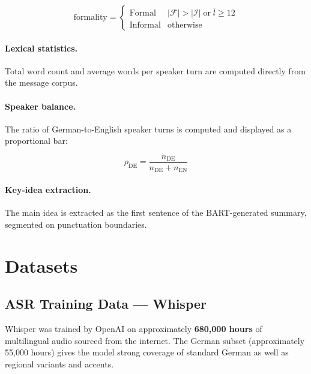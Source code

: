 \documentclass[12pt,a4paper]{report}
\begin{document}
\begin{equation}
  \text{formality} =
  \begin{cases}
    \text{Formal}   & |\mathcal{F}| > |\mathcal{I}| \;\text{or}\; \bar{l} \ge 12 \\
    \text{Informal} & \text{otherwise}
  \end{cases}
\end{equation}

\paragraph{Lexical statistics.}
Total word count and average words per speaker turn are computed
directly from the message corpus.

\paragraph{Speaker balance.}
The ratio of German-to-English speaker turns is computed and displayed
as a proportional bar:

\begin{equation}
  \rho_{\mathrm{DE}} = \frac{n_{\mathrm{DE}}}{n_{\mathrm{DE}} + n_{\mathrm{EN}}}
\end{equation}

\paragraph{Key-idea extraction.}
The main idea is extracted as the first sentence of the BART-generated
summary, segmented on punctuation boundaries.

\section{Datasets}

\subsection{ASR Training Data — Whisper}

Whisper was trained by OpenAI on approximately \textbf{680{,}000 hours}
of multilingual audio sourced from the internet. The German subset
(approximately 55{,}000 hours) gives the model strong coverage of
standard German as well as regional variants and accents.
\end{document}
